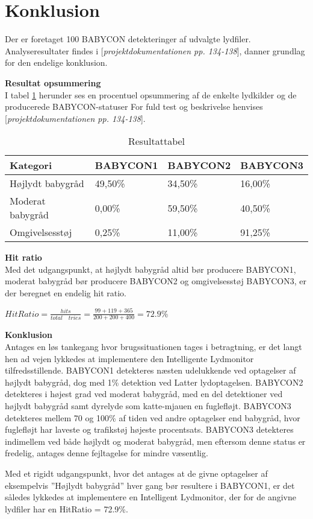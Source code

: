 \newpage
\section{Konklusion}
Der er foretaget 100 BABYCON detekteringer af udvalgte lydfiler. Analyseresultater findes i [\textit{projektdokumentationen pp. 134-138}], danner grundlag for den endelige konklusion. 

\textbf{Resultat opsummering}\\
I tabel \ref{IL:result} herunder ses en procentuel opsummering af de enkelte lydkilder og de producerede BABYCON-statuser 
For fuld test og beskrivelse henvises [\textit{projektdokumentationen pp. 134-138}].

\begin{table}[!htbp] \centering
	\caption{Resultattabel}
	\label{IL:result}
	\begin{tabular}{|l|l|l|l|}
	\hline
		\textbf{Kategori} & \textbf{BABYCON1} & \textbf{BABYCON2} & \textbf{BABYCON3}\\\hline
		Højlydt babygråd & 49,50\% & 34,50\% & 16,00\% \\\hline
		Moderat babygråd & 0,00\% & 59,50\% & 40,50\% \\\hline
		Omgivelsesstøj & 0,25\% & 11,00\% & 91,25\% \\\hline
	\end{tabular}
\end{table}

\textbf{Hit ratio}\\
Med det udgangspunkt, at højlydt babygråd altid bør producere BABYCON1, moderat babygråd bør producere BABYCON2 og omgivelsesstøj BABYCON3, er der beregnet en endelig hit ratio. 
\begin{center}
$HitRatio=\frac { hits }{ total\quad tries } =\frac { 99+119+365 }{ 200+200+400 } =72.9$\%
\end{center}

\textbf{Konklusion}\\
Antages en løs tankegang hvor brugssituationen tages i betragtning, er det langt hen ad
vejen lykkedes at implementere den Intelligente Lydmonitor tilfredsstillende. BABYCON1
detekteres næsten udelukkende ved optagelser af højlydt babygråd, dog med 1\% detektion ved
Latter lydoptagelsen. BABYCON2 detekteres i højest grad ved moderat babygråd, med
en del detektioner ved højlydt babygråd samt dyrelyde som katte-mjauen en fuglefløjt.
BABYCON3 detekteres mellem 70 og 100\% af tiden ved andre optagelser end babygråd,
hvor fuglefløjt har laveste og trafikstøj højeste procentsats. BABYCON3 detekteres
indimellem ved både højlydt og moderat babygråd, men eftersom denne status er fredelig,
antages denne fejltagelse for mindre væsentlig.

Med et rigidt udgangspunkt, hvor det antages at de givne optagelser af eksempelvis
”Højlydt babygråd” hver gang bør resultere i BABYCON1, er det således lykkedes at implementere
en Intelligent Lydmonitor, der for de angivne lydfiler har en HitRatio = 72.9\%.




 
